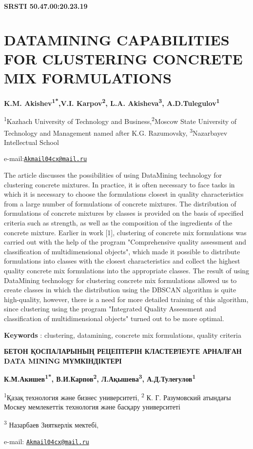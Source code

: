 \clearpage
{\bfseries SRSTI 50.47.00:20.23.19}

\section{DATAMINING CAPABILITIES FOR CLUSTERING CONCRETE MIX
FORMULATIONS}

\begin{center}
{\bfseries K.M. Akishev\textsuperscript{1*},V.I. Karpov\textsuperscript{2},
L.A. Akisheva\textsuperscript{3}, A.D.Tulegulov\textsuperscript{1}}

\textsuperscript{1}Kazhach University of Technology and
Business,\textsuperscript{2}Moscow State University of Technology and
Management named after K.G. Razumovsky, \textsuperscript{3}Nazarbayev
Intellectual School

e-mail:\href{mailto:Akmail04cx@mail.ru}{\nolinkurl{Akmail04cx@mail.ru}}
\end{center}

The article discusses the possibilities of using DataMining technology
for clustering concrete mixtures. In practice, it is often necessary to
face tasks in which it is necessary to choose the formulations closest
in quality characteristics from a large number of formulations of
concrete mixtures. The distribution of formulations of concrete mixtures
by classes is provided on the basis of specified criteria such as
strength, as well as the composition of the ingredients of the concrete
mixture. Earlier in work {[}1{]}, clustering of concrete mix
formulations was carried out with the help of the program "Comprehensive
quality assessment and classification of multidimensional objects",
which made it possible to distribute formulations into classes with the
closest characteristics and collect the highest quality concrete mix
formulations into the appropriate classes. The result of using
DataMining technology for clustering concrete mix formulations allowed
us to create classes in which the distribution using the DBSCAN
algorithm is quite high-quality, however, there is a need for more
detailed training of this algorithm, since clustering using the program
"Integrated Quality Assessment and classification of multidimensional
objects" turned out to be more optimal.

{\bfseries Keywords} : clustering, datamining, concrete mix formulations,
quality criteria

\begin{center}
{\large\bfseries БЕТОН ҚОСПАЛАРЫНЫҢ РЕЦЕПТЕРІН КЛАСТЕРЛЕУГЕ АРНАЛҒАН DATA MINING
МҮМКІНДІКТЕРІ}

{\bfseries К.М.Акишев\textsuperscript{1*}, В.И.Карпов\textsuperscript{2},
Л.Ақышева\textsuperscript{3}, А.Д.Тулеғулов\textsuperscript{1}}

\textsuperscript{1}Қазақ технология және бизнес университеті,
\textsuperscript{2} К. Г. Разумовский атындағы Москеу мемлекеттік
технология және басқару университеті

\textsuperscript{3} Назарбаев Зияткерлік мектебі,

e-mail: \href{mailto:Akmail04cx@mail.ru}{\nolinkurl{Akmail04cx@mail.ru}}
\end{center}

